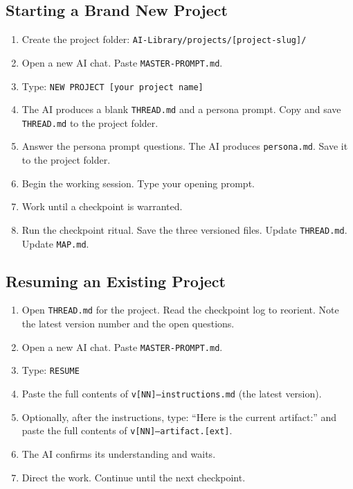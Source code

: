 \documentclass[12pt,letterpaper]{article}
\begin{document}
\subsection{Starting a Brand New Project}

\begin{enumerate}
  \item Create the project folder:
        \texttt{AI-Library/projects/[project-slug]/}

  \item Open a new AI chat. Paste \texttt{MASTER-PROMPT.md}.

  \item Type: \texttt{NEW PROJECT [your project name]}

  \item The AI produces a blank \texttt{THREAD.md} and a persona prompt.
        Copy and save \texttt{THREAD.md} to the project folder.

  \item Answer the persona prompt questions. The AI produces \texttt{persona.md}.
        Save it to the project folder.

  \item Begin the working session. Type your opening prompt.

  \item Work until a checkpoint is warranted.

  \item Run the checkpoint ritual. Save the three versioned files.
        Update \texttt{THREAD.md}. Update \texttt{MAP.md}.
\end{enumerate}

\subsection{Resuming an Existing Project}

\begin{enumerate}
  \item Open \texttt{THREAD.md} for the project. Read the checkpoint log
        to reorient. Note the latest version number and the open questions.

  \item Open a new AI chat. Paste \texttt{MASTER-PROMPT.md}.

  \item Type: \texttt{RESUME}

  \item Paste the full contents of \texttt{v[NN]--instructions.md}
        (the latest version).

  \item Optionally, after the instructions, type:
        ``Here is the current artifact:''
        and paste the full contents of \texttt{v[NN]--artifact.[ext]}.

  \item The AI confirms its understanding and waits.

  \item Direct the work. Continue until the next checkpoint.
\end{enumerate}
\end{document}
